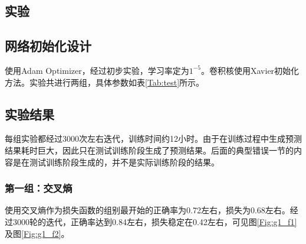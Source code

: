 \begin{spacing}{2}
    \section{实验}
\end{spacing}
\subsection{网络初始化设计}
使用Adam Optimizer，经过初步实验，学习率定为$1^{-5}$。卷积核使用Xavier初始化方法。实验共进行两组，具体参数如表\ref{Tab:test}所示。
\begin{table}[htbp]
    
    \centering
    \caption{实验分组}
    \label{Tab:test}
    
\end{table}
\subsection{实验结果}
每组实验都经过3000次左右迭代，训练时间约12小时。由于在训练过程中生成预测结果耗时巨大，因此只在测试训练阶段生成了预测结果。后面的典型错误一节的内容是在测试训练阶段生成的，并不是实际训练阶段的结果。
\subsubsection{第一组：交叉熵}

使用交叉熵作为损失函数的组别最开始的正确率为0.72左右，损失为0.68左右。经过3000轮的迭代，正确率达到0.84左右，损失稳定在0.42左右，可见图\ref{Fig:g1_f1}及图\ref{Fig:g1_f2}。

